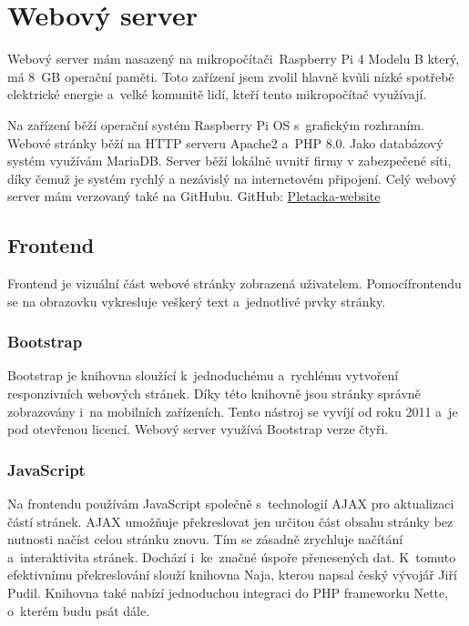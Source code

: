 \chapter{Webový server}
Webový server mám nasazený na mikropočítači~Raspberry Pi 4 Modelu B který, má 8~GB operační paměti.
Toto zařízení jsem zvolil hlavně kvůli nízké spotřebě elektrické energie a~velké komunitě lidí, kteří tento mikropočítač využívají.

Na zařízení běží operační systém Raspberry Pi OS s~grafickým rozhraním.
Webové stránky běží na HTTP serveru Apache2 a~PHP 8.0.
Jako databázový systém využívám MariaDB.
Server běží lokálně uvnitř firmy v zabezpečené síti, díky čemuž je systém rychlý a nezávislý na internetovém připojení.
Celý webový server mám verzovaný také na GitHubu.\newline
GitHub: \href{https://github.com/Pletacka-IoT/Pletacka-website}{Pletacka-website}\cite{PL_WEB}

\section{Frontend}
 
Frontend je vizuální část webové stránky zobrazená uživatelem.
Pomocí\newline frontendu se na obrazovku vykresluje veškerý text a~jednotlivé prvky stránky.

\subsection{Bootstrap}
Bootstrap je knihovna sloužící k~jednoduchému a~rychlému vytvoření responzivních webových stránek.
Díky této knihovně jsou stránky správně zobrazovány i~na mobilních zařízeních.
Tento nástroj se vyvíjí od roku 2011 a~je pod otevřenou licencí.
Webový server využívá Bootstrap verze čtyři.


\subsection{JavaScript}
Na frontendu používám JavaScript společně s~technologií AJAX pro aktualizaci částí stránek. AJAX umožňuje překreslovat jen určitou část obsahu stránky bez nutnosti načíst celou stránku znovu.
Tím se zásadně zrychluje načítání a~interaktivita stránek. Dochází i~ke~značné úspoře přenesených dat.
K~tomuto efektivnímu překreslování slouží knihovna Naja\cite{NAJA}, kterou napsal český vývojář Jiří Pudil.
Knihovna také nabízí jednoduchou integraci do PHP frameworku Nette, o~kterém budu psát dále.   




